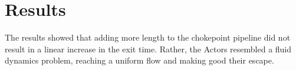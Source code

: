 \documentclass[12pt,letterpaper]{article}
\begin{document}
%
%
%
%
%
%


\section{Results}

The results showed that adding more length to the chokepoint pipeline did not
result in a linear increase in the exit time. Rather, the Actors resembled a
fluid dynamics problem, reaching a uniform flow and making good their escape.
\end{document}
